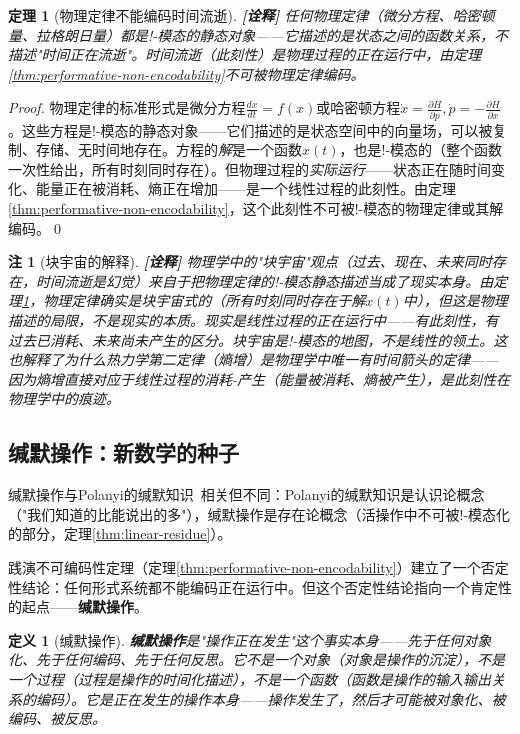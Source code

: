 \documentclass[11pt,a4paper]{article}
\newtheorem{definition}{定义}
\newtheorem{theorem}{定理}
\newtheorem{remark}{注}
\newcommand{\lvl}[1]{\hfill\textbf{\footnotesize[#1]}}
\newcommand{\lvI}{\lvl{诠释}}
\newcommand{\bang}{{!}}
\begin{document}
\begin{theorem}[物理定律不能编码时间流逝]\label{thm:physics-time}\lvI
任何物理定律（微分方程、哈密顿量、拉格朗日量）都是!-模态的静态对象——它描述的是状态之间的函数关系，不描述"时间正在流逝"。时间流逝（此刻性）是物理过程的正在运行中，由定理\ref{thm:performative-non-encodability}不可被物理定律编码。
\end{theorem}

\begin{proof}
物理定律的标准形式是微分方程$\frac{dx}{dt}=f(x)$或哈密顿方程$\dot{x}=\frac{\partial H}{\partial p},\dot{p}=-\frac{\partial H}{\partial x}$。这些方程是!-模态的静态对象——它们描述的是状态空间中的向量场，可以被复制、存储、无时间地存在。方程的\emph{解}是一个函数$x(t)$，也是!-模态的（整个函数一次性给出，所有时刻同时存在）。但物理过程的\emph{实际运行}——状态正在随时间变化、能量正在被消耗、熵正在增加——是一个线性过程的此刻性。由定理\ref{thm:performative-non-encodability}，这个此刻性不可被!-模态的物理定律或其解编码。\qed
\end{proof}

\begin{remark}[块宇宙的解释]\lvI
物理学中的"块宇宙"观点（过去、现在、未来同时存在，时间流逝是幻觉）来自于把物理定律的!-模态静态描述当成了现实本身。由定理\ref{thm:physics-time}，物理定律确实是块宇宙式的（所有时刻同时存在于解$x(t)$中），但这是物理描述的局限，不是现实的本质。现实是线性过程的正在运行中——有此刻性，有过去已消耗、未来尚未产生的区分。块宇宙是!-模态的地图，不是线性的领土。这也解释了为什么热力学第二定律（熵增）是物理学中唯一有时间箭头的定律——因为熵增直接对应于线性过程的消耗-产生（能量被消耗、熵被产生），是此刻性在物理学中的痕迹。
\end{remark}

\subsection{缄默操作：新数学的种子}

缄默操作与Polanyi的缄默知识~\cite{polanyi66}相关但不同：Polanyi的缄默知识是认识论概念（"我们知道的比能说出的多"），缄默操作是存在论概念（活操作中不可被$\bang$-模态化的部分，定理\ref{thm:linear-residue}）。

践演不可编码性定理（定理\ref{thm:performative-non-encodability}）建立了一个否定性结论：任何形式系统都不能编码正在运行中。但这个否定性结论指向一个肯定性的起点——\textbf{缄默操作}。

\begin{definition}[缄默操作]\label{def:tacit-operation}
\textbf{缄默操作}是"操作正在发生"这个事实本身——先于任何对象化、先于任何编码、先于任何反思。它不是一个对象（对象是操作的沉淀），不是一个过程（过程是操作的时间化描述），不是一个函数（函数是操作的输入输出关系的编码）。它是正在发生的操作本身——操作发生了，然后才可能被对象化、被编码、被反思。
\end{definition}
\end{document}
